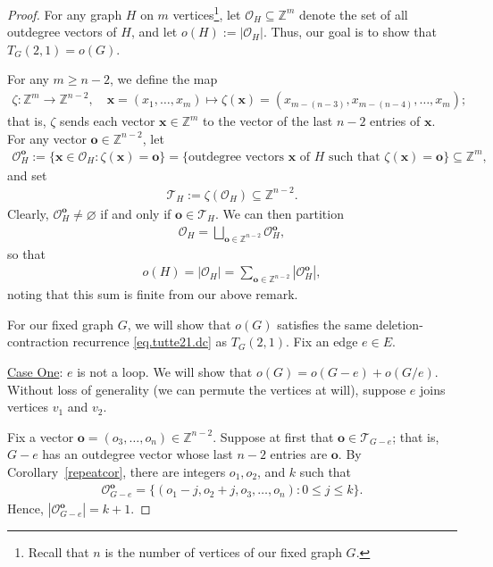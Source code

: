 \documentclass[12pt]{article}
\renewcommand{\emptyset}{\varnothing} %
\theoremstyle{definition}
\theoremstyle{remark}
\newcommand{\oo}{\mathbf{o}}
\newcommand{\abs}[1]{\left| #1 \right|}
\newcommand{\out}{\mathscr{O}}
\newcommand{\tu}{\mathscr{T}}
\begin{document}
\begin{proof} 
    For any graph $H$ on $m$ vertices\footnote{Recall that $n$ is the number of vertices of our fixed graph $G$.}, let $\out_H \subseteq \mathbb{Z}^{m}$ denote the set of all outdegree vectors of $H$, and let $o(H) := |\out_H|$. Thus, our goal is to show that $T_G(2,1) = o(G)$.
	
	For any $m \geq n-2$, we define the map \begin{align*}
        \zeta : \mathbb{Z}^{m} \to \mathbb{Z}^{n-2}, \quad \mathbf{x}=(x_1,\ldots,x_m) \mapsto \zeta(\mathbf{x})=(x_{m-(n-3)},x_{m-(n-4)},\ldots,x_m);
    \end{align*} that is, $\zeta$ sends each vector $\mathbf{x} \in \mathbb{Z}^{m}$ to the vector of the last $n-2$ entries of $\mathbf{x}$. For any vector $\mathbf{o} \in \mathbb{Z}^{n-2}$, let \begin{align*}
        \mathscr{O}_H^{\mathbf{o}} :=
		\{\mathbf{x} \in \out_H : \zeta(\mathbf{x}) = \mathbf{o}\}
		=
		\{\text{outdegree vectors $\mathbf{x}$ of $H$ such that $\zeta(\mathbf{x}) = \mathbf{o}$}\} \subseteq \mathbb{Z}^{m},
    \end{align*} and set \begin{align*}
        \mathscr{T}_H := \zeta(\mathscr{O}_H) \subseteq \mathbb{Z}^{n-2}.
    \end{align*} Clearly, $\out_H^\textbf{o} \neq \emptyset$ if and only if $\textbf{o} \in \tu_H$. We can then partition \begin{align*}
        \out_H = \bigsqcup_{\textbf{o} \in \mathbb{Z}^{n-2}}\out_H^\textbf{o},
    \end{align*} so that \begin{align*}
        o(H) = |\out_H| = \sum_{\textbf{o} \in \mathbb{Z}^{n-2}}|\out_H^\textbf{o}|,
    \end{align*} noting that this sum is finite from our above remark.

    For our fixed graph $G$, we will show that $o(G)$ satisfies the same deletion-contraction recurrence \eqref{eq.tutte21.dc} as $T_G(2,1)$. Fix an edge $e \in E$.
    
    \bigskip
    \noindent\underline{Case One}: $e$ is not a loop. We will show that $o(G)=o(G-e)+o(G/e)$. Without loss of generality (we can permute the vertices at will), suppose $e$ joins vertices $v_1$ and $v_2$. 
    
    Fix a vector $\textbf{o} = (o_3,\ldots,o_n) \in \mathbb{Z}^{n-2}$.
	Suppose at first that $\oo \in \mathscr{T}_{G-e}$;
	that is, $G-e$ has an outdegree vector whose last $n-2$ entries are $\oo$.
	By Corollary~\ref{repeatcor}, there are integers $o_1,o_2$, and $k$ such that 
	\begin{align*}
        \out_{G-e}^{\textbf{o}} = \{(o_1-j,o_2+j,o_3,\ldots,o_n) : 0 \leq j \leq k\}.
    \end{align*}
	Hence, $\abs{\out_{G-e}^\textbf{o}} = k+1$.
	

\end{proof}
\end{document}
